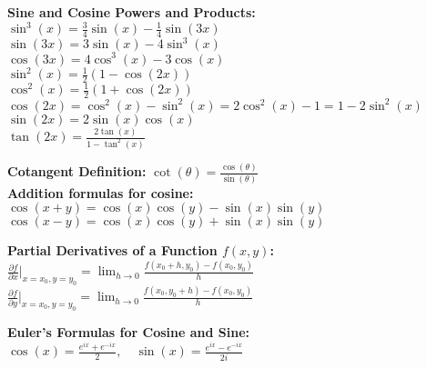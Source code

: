 \documentclass[a4paper,7pt,fleqn]{article}
\begin{document}
\begin{multicols}{3}
\begin{minipage}{\linewidth}
\textbf{Sine and Cosine Powers and Products:}
\(  \sin^3(x) = \frac{3}{4}\sin(x) - \frac{1}{4}\sin(3x) \) \\
\( \sin(3x) = 3\sin(x) - 4\sin^3(x) \) \\
\( \cos(3x) = 4\cos^3(x) - 3\cos(x) \) \\
\( \sin^2(x) = \frac{1}{2} (1 - \cos(2x))  \) \\
\( \cos^2(x)  = \frac{1}{2} (1 + \cos(2x)) \) \\

\( \cos(2x) = \cos^2(x) - \sin^2(x) = 2\cos^2(x) - 1 = 1 - 2\sin^2(x) \) \\
\( \sin(2x) = 2\sin(x)\cos(x) \) \\
\( \tan(2x) = \frac{2\tan(x)}{1-\tan^2(x)} \) \\
\end{minipage}
\begin{minipage}{\linewidth}
\textbf{Cotangent Definition:}
\( \cot(\theta) = \frac{\cos(\theta)}{\sin(\theta)} \) \\
\textbf{Addition formulas for cosine:}
\( \cos(x + y) = \cos(x)\cos(y) - \sin(x)\sin(y) \) \\
\( \cos(x - y) = \cos(x)\cos(y) + \sin(x)\sin(y) \) \\

\end{minipage}
\begin{minipage}{\linewidth}

\textbf{Partial Derivatives of a Function $f(x, y)$:} \\[-0.2cm]
\( \frac{\partial f}{\partial x} \Bigg|_{x=x_0, y=y_0} = \lim_{h \to 0} \frac{f(x_0 + h, y_0) - f(x_0, y_0)}{h} \) \\

\( \frac{\partial f}{\partial y} \Bigg|_{x=x_0, y=y_0} = \lim_{h \to 0} \frac{f(x_0, y_0 + h) - f(x_0, y_0)}{h} \) \\

\end{minipage}

\begin{minipage}{\linewidth}
\textbf{Euler's Formulas for Cosine and Sine:}
\( \cos(x) = \frac{e^{ix} + e^{-ix}}{2}, \quad \sin(x) = \frac{e^{ix} - e^{-ix}}{2i} \) \\
\end{minipage}

 \begin{minipage}{\linewidth}


\end{minipage}
\end{multicols}
\end{document}
